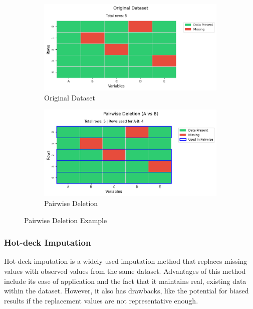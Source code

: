 \documentclass[a4paper,12pt]{article}
\begin{document}
\begin{figure}[H]
\centering
\begin{subfigure}{0.48\textwidth}
\includegraphics[width=\linewidth]{original_dataset.png}
\caption{Original Dataset}
\end{subfigure}
\hfill
\begin{subfigure}{0.48\textwidth}
\includegraphics[width=\linewidth]{pairwise_deletion_(a_vs_b).png}
\caption{Pairwise Deletion}
\end{subfigure}
\caption{Pairwise Deletion Example}
\end{figure}

\subsubsection{Hot-deck Imputation}

Hot-deck imputation is a widely used imputation method that replaces missing values with observed values from the same dataset. Advantages of this method include its ease of application and the fact that it maintains real, existing data within the dataset. However, it also has drawbacks, like the potential for biased results if the replacement values are not representative enough. ~\cite{33}
\end{document}

